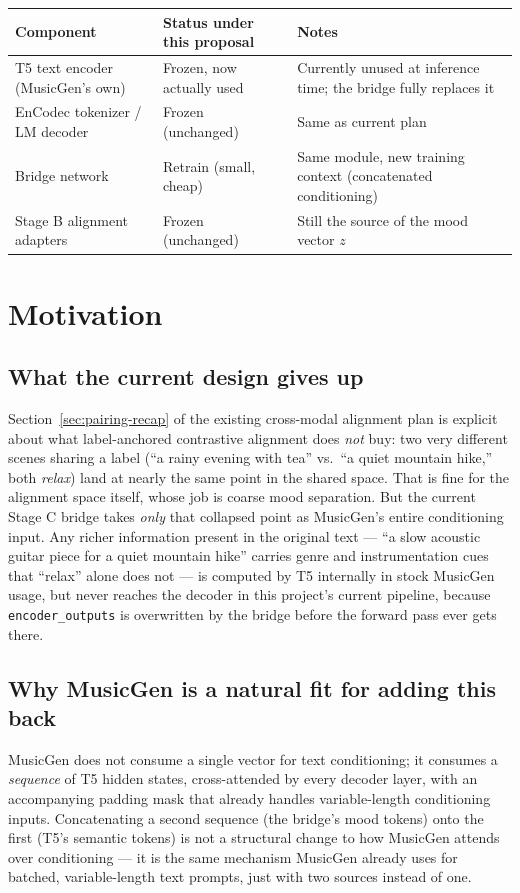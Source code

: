 \documentclass[11pt]{article}
\begin{document}
\begin{center}
\begin{tabularx}{\textwidth}{@{}X l X@{}}
\toprule
\textbf{Component} & \textbf{Status under this proposal} & \textbf{Notes} \\
\midrule
T5 text encoder (MusicGen's own) & Frozen, now actually used & Currently unused at inference time; the bridge fully replaces it \\
EnCodec tokenizer / LM decoder & Frozen (unchanged) & Same as current plan \\
Bridge network & Retrain (small, cheap) & Same module, new training context (concatenated conditioning) \\
Stage B alignment adapters & Frozen (unchanged) & Still the source of the mood vector $z$ \\
\bottomrule
\end{tabularx}
\end{center}

\section{Motivation}

\subsection{What the current design gives up}
Section~\ref{sec:pairing-recap} of the existing cross-modal alignment plan is explicit about what
label-anchored contrastive alignment does \emph{not} buy: two very different scenes sharing a
label (``a rainy evening with tea'' vs.\ ``a quiet mountain hike,'' both \emph{relax}) land at
nearly the same point in the shared space. That is fine for the alignment space itself, whose job
is coarse mood separation. But the current Stage C bridge takes \emph{only} that collapsed point
as MusicGen's entire conditioning input. Any richer information present in the original text ---
``a slow acoustic guitar piece for a quiet mountain hike'' carries genre and instrumentation cues
that ``relax'' alone does not --- is computed by T5 internally in stock MusicGen usage, but never
reaches the decoder in this project's current pipeline, because \texttt{encoder\_outputs} is
overwritten by the bridge before the forward pass ever gets there.

\subsection{Why MusicGen is a natural fit for adding this back}
MusicGen does not consume a single vector for text conditioning; it consumes a \emph{sequence} of
T5 hidden states, cross-attended by every decoder layer, with an accompanying padding mask that
already handles variable-length conditioning inputs. Concatenating a second sequence (the bridge's
mood tokens) onto the first (T5's semantic tokens) is not a structural change to how MusicGen
attends over conditioning --- it is the same mechanism MusicGen already uses for batched,
variable-length text prompts, just with two sources instead of one.
\end{document}
